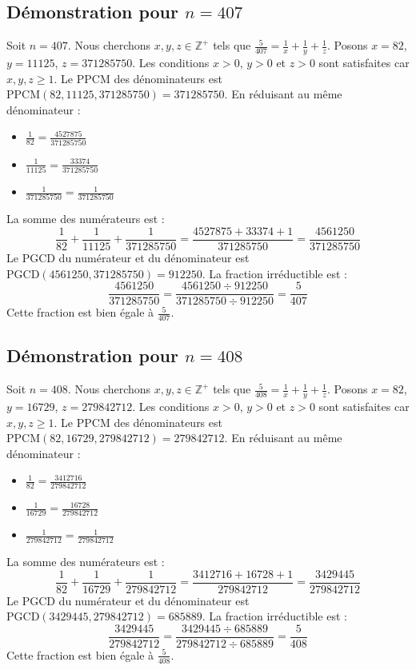 \documentclass[11pt,a4paper]{article}
\begin{document}
\subsection{Démonstration pour $n = 407$}
Soit $n = 407$. Nous cherchons $x, y, z \in \mathbb{Z}^{+}$ tels que $\frac{5}{407} = \frac{1}{x} + \frac{1}{y} + \frac{1}{z}$.
Posons $x = 82$, $y = 11125$, $z = 371285750$.
Les conditions $x > 0$, $y > 0$ et $z > 0$ sont satisfaites car $x, y, z \geq 1$.
Le PPCM des dénominateurs est $\text{PPCM}(82, 11125, 371285750) = 371285750$.
En réduisant au même dénominateur :
\begin{itemize}
    \item $\frac{1}{82} = \frac{4527875}{371285750}$
    \item $\frac{1}{11125} = \frac{33374}{371285750}$
    \item $\frac{1}{371285750} = \frac{1}{371285750}$
\end{itemize}
La somme des numérateurs est :
$$ \frac{1}{82} + \frac{1}{11125} + \frac{1}{371285750} = \frac{4527875 + 33374 + 1}{371285750} = \frac{4561250}{371285750} $$
Le PGCD du numérateur et du dénominateur est $\text{PGCD}(4561250, 371285750) = 912250$.
La fraction irréductible est :
$$ \frac{4561250}{371285750} = \frac{4561250 \div 912250}{371285750 \div 912250} = \frac{5}{407} $$
Cette fraction est bien égale à $\frac{5}{407}$.

\subsection{Démonstration pour $n = 408$}
Soit $n = 408$. Nous cherchons $x, y, z \in \mathbb{Z}^{+}$ tels que $\frac{5}{408} = \frac{1}{x} + \frac{1}{y} + \frac{1}{z}$.
Posons $x = 82$, $y = 16729$, $z = 279842712$.
Les conditions $x > 0$, $y > 0$ et $z > 0$ sont satisfaites car $x, y, z \geq 1$.
Le PPCM des dénominateurs est $\text{PPCM}(82, 16729, 279842712) = 279842712$.
En réduisant au même dénominateur :
\begin{itemize}
    \item $\frac{1}{82} = \frac{3412716}{279842712}$
    \item $\frac{1}{16729} = \frac{16728}{279842712}$
    \item $\frac{1}{279842712} = \frac{1}{279842712}$
\end{itemize}
La somme des numérateurs est :
$$ \frac{1}{82} + \frac{1}{16729} + \frac{1}{279842712} = \frac{3412716 + 16728 + 1}{279842712} = \frac{3429445}{279842712} $$
Le PGCD du numérateur et du dénominateur est $\text{PGCD}(3429445, 279842712) = 685889$.
La fraction irréductible est :
$$ \frac{3429445}{279842712} = \frac{3429445 \div 685889}{279842712 \div 685889} = \frac{5}{408} $$
Cette fraction est bien égale à $\frac{5}{408}$.
\end{document}
